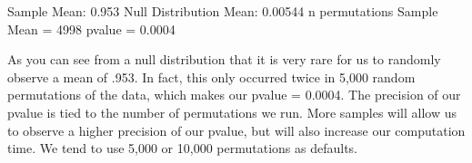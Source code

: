 \documentclass[letterpaper,10pt,english]{sphinxmanual}
\begin{document}
\begin{sphinxVerbatim}[commandchars=\\\{\}]
    

  
\end{sphinxVerbatim}

\begin{sphinxVerbatim}[commandchars=\\\{\}]
Sample Mean: 0.953
Null Distribution Mean: 0.00544
n permutations \PYGZlt{} Sample Mean = 4998
p\PYGZhy{}value = 0.0004
\end{sphinxVerbatim}

\noindent{}

As you can see from a null distribution that it is very rare for us to randomly observe a mean of .953. In fact, this only occurred twice in 5,000 random permutations of the data, which makes our p\sphinxhyphen{}value = 0.0004. The precision of our p\sphinxhyphen{}value is tied to the number of permutations we run. More samples will allow us to observe a higher precision of our p\sphinxhyphen{}value, but will also increase our computation time. We tend to use 5,000 or 10,000 permutations as defaults.
\end{document}
